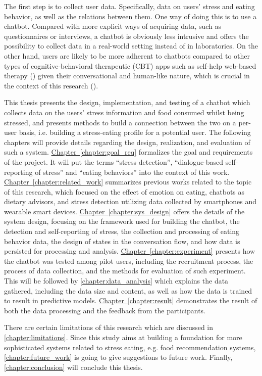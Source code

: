 \noindent The first step is to collect user data. Specifically, data on users’ stress and eating behavior, as well as the relations between them. One way of doing this is to use a chatbot. Compared with more explicit ways of acquiring data, such as questionnaires or interviews, a chatbot is obviously less intrusive and offers the possibility to collect data in a real-world setting instead of in laboratories. On the other hand, users are likely to be more adherent to chatbots compared to other types of cognitive-behavioral therapeutic (CBT) apps such as self-help web-based therapy (\cite{6_cbt}) given their conversational and human-like nature, which is crucial in the context of this research (\cite{3_woebot}).

This thesis presents the design, implementation, and testing of a chatbot which collects data on the users’ stress information and food consumed whilst being stressed, and presents methods to build a connection between the two on a per-user basis, i.e. building a stress-eating profile for a potential user. The following chapters will provide details regarding the design, realization, and evaluation of such a system. \hyperref[chapter:goal_req]{Chapter~\ref*{chapter:goal_req}} formalizes the goal and requirements of the project. It will put the terms “stress detection”, “dialogue-based self-reporting of stress” and “eating behaviors” into the context of this work. \hyperref[chapter:related_work]{Chapter~\ref*{chapter:related_work}} summarizes previous works related to the topic of this research, which focused on the effect of emotion on eating, chatbots as dietary advisors, and stress detection utilizing data collected by smartphones and wearable smart devices. \hyperref[chapter:sys_design]{Chapter~\ref*{chapter:sys_design}} offers the details of the system design, focusing on the framework used for building the chatbot, the detection and self-reporting of stress, the collection and processing of eating behavior data, the design of states in the conversation flow, and how data is persisted for processing and analysis. \hyperref[chapter:experiment]{Chapter~\ref*{chapter:experiment}} presents how the chatbot was tested among pilot users, including the recruitment process, the process of data collection, and the methods for evaluation of such experiment. This will be followed by \autoref{chapter:data_analysis} which explains the data gathered, including the data size and content, as well as how the data is trained to result in predictive models. \hyperref[chapter:result]{Chapter~\ref*{chapter:result}} demonstrates the result of both the data processing and the feedback from the participants.

There are certain limitations of this research which are discussed in \autoref{chapter:limitations}. Since this study aims at building a foundation for more sophisticated systems related to stress eating, e.g. food recommendation systems, \autoref{chapter:future_work} is going to give suggestions to future work. Finally, \autoref{chapter:conclusion} will conclude this thesis.
